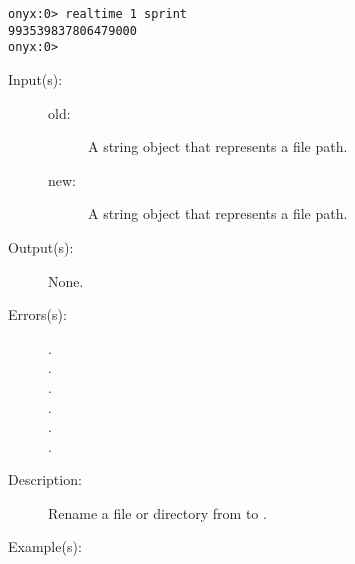 \begin{description}
\begin{description}
\begin{verbatim}
onyx:0> realtime 1 sprint
993539837806479000
onyx:0>
		\end{verbatim}
	\end{description}
\label{systemdict:rename}
\item[{\onyxop{old new}{rename}{--}}: ]
	\begin{description}\item[]
	\item[Input(s): ]
		\begin{description}\item[]
		\item[old: ]
			A string object that represents a file path.
		\item[new: ]
			A string object that represents a file path.
		\end{description}
	\item[Output(s): ] None.
	\item[Errors(s): ]
		\begin{description}\item[]
		\item[.]
		\item[.]
		\item[.]
		\item[.]
		\item[.]
		\item[.]
		\end{description}
	\item[Description: ]
		Rename a file or directory from  to .
	\item[Example(s): ]\begin{verbatim}


\end{verbatim}
\end{description}
\end{description}
